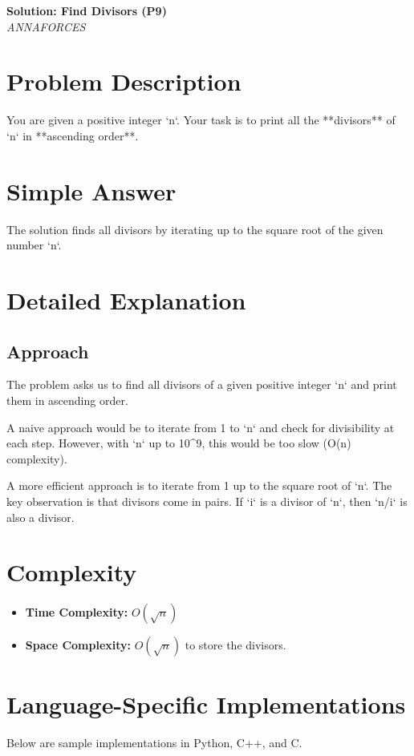 \documentclass[11pt,a4paper]{article}
\begin{document}
\begin{center}
  {\LARGE \bf Solution: Find Divisors (P9)}\\[6pt]
  {\large \it ANNAFORCES}\
  \vspace{6pt}
\end{center}

\section*{Problem Description}
You are given a positive integer `n`.
Your task is to print all the **divisors** of `n` in **ascending order**.

\section*{Simple Answer}
The solution finds all divisors by iterating up to the square root of the given number `n`.

\section*{Detailed Explanation}
\subsection*{Approach}
The problem asks us to find all divisors of a given positive integer `n` and print them in ascending order.

A naive approach would be to iterate from 1 to `n` and check for divisibility at each step. However, with `n` up to 10^9, this would be too slow (O(n) complexity).

A more efficient approach is to iterate from 1 up to the square root of `n`. The key observation is that divisors come in pairs. If `i` is a divisor of `n`, then `n/i` is also a divisor.

\section*{Complexity}
\begin{itemize}[leftmargin=*]
  \item \textbf{Time Complexity:} $O(\sqrt{n})$
  \item \textbf{Space Complexity:} $O(\sqrt{n})$ to store the divisors.
\end{itemize}

\section*{Language-Specific Implementations}
Below are sample implementations in Python, C++, and C.
\end{document}
